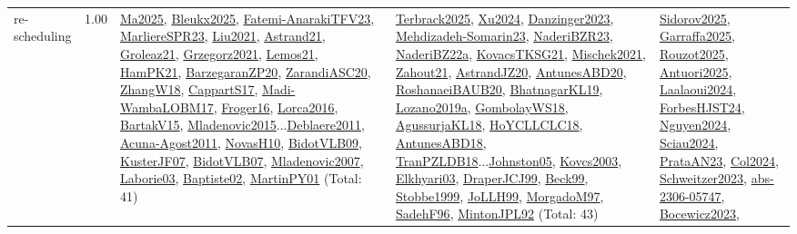 {\begin{longtable}{p{3cm}r>{\raggedright\arraybackslash}p{6cm}>{\raggedright\arraybackslash}p{6cm}>{\raggedright\arraybackslash}p{8cm}}
\index{re-scheduling}\index{Concepts!re-scheduling}re-scheduling &  1.00 & \hyperref[detail:Ma2025]{Ma2025}, \hyperref[detail:Bleukx2025]{Bleukx2025}, \hyperref[detail:Fatemi-AnarakiTFV23]{Fatemi-AnarakiTFV23}, \hyperref[detail:MarliereSPR23]{MarliereSPR23}, \hyperref[detail:Liu2021]{Liu2021}, \hyperref[detail:Astrand21]{Astrand21}, \hyperref[detail:Groleaz21]{Groleaz21}, \hyperref[detail:Grzegorz2021]{Grzegorz2021}, \hyperref[detail:Lemos21]{Lemos21}, \hyperref[detail:HamPK21]{HamPK21}, \hyperref[detail:BarzegaranZP20]{BarzegaranZP20}, \hyperref[detail:ZarandiASC20]{ZarandiASC20}, \hyperref[detail:ZhangW18]{ZhangW18}, \hyperref[detail:CappartS17]{CappartS17}, \hyperref[detail:Madi-WambaLOBM17]{Madi-WambaLOBM17}, \hyperref[detail:Froger16]{Froger16}, \hyperref[detail:Lorca2016]{Lorca2016}, \hyperref[detail:BartakV15]{BartakV15}, \hyperref[detail:Mladenovic2015]{Mladenovic2015}...\hyperref[detail:Deblaere2011]{Deblaere2011}, \hyperref[detail:Acuna-Agost2011]{Acuna-Agost2011}, \hyperref[detail:NovasH10]{NovasH10}, \hyperref[detail:BidotVLB09]{BidotVLB09}, \hyperref[detail:KusterJF07]{KusterJF07}, \hyperref[detail:BidotVLB07]{BidotVLB07}, \hyperref[detail:Mladenovic2007]{Mladenovic2007}, \hyperref[detail:Laborie03]{Laborie03}, \hyperref[detail:Baptiste02]{Baptiste02}, \hyperref[detail:MartinPY01]{MartinPY01} (Total: 41) & \hyperref[detail:Terbrack2025]{Terbrack2025}, \hyperref[detail:Xu2024]{Xu2024}, \hyperref[detail:Danzinger2023]{Danzinger2023}, \hyperref[detail:Mehdizadeh-Somarin23]{Mehdizadeh-Somarin23}, \hyperref[detail:NaderiBZR23]{NaderiBZR23}, \hyperref[detail:NaderiBZ22a]{NaderiBZ22a}, \hyperref[detail:KovacsTKSG21]{KovacsTKSG21}, \hyperref[detail:Mischek2021]{Mischek2021}, \hyperref[detail:Zahout21]{Zahout21}, \hyperref[detail:AstrandJZ20]{AstrandJZ20}, \hyperref[detail:AntunesABD20]{AntunesABD20}, \hyperref[detail:RoshanaeiBAUB20]{RoshanaeiBAUB20}, \hyperref[detail:BhatnagarKL19]{BhatnagarKL19}, \hyperref[detail:Lozano2019a]{Lozano2019a}, \hyperref[detail:GombolayWS18]{GombolayWS18}, \hyperref[detail:AgussurjaKL18]{AgussurjaKL18}, \hyperref[detail:HoYCLLCLC18]{HoYCLLCLC18}, \hyperref[detail:AntunesABD18]{AntunesABD18}, \hyperref[detail:TranPZLDB18]{TranPZLDB18}...\hyperref[detail:Johnston05]{Johnston05}, \hyperref[detail:Kovcs2003]{Kovcs2003}, \hyperref[detail:Elkhyari03]{Elkhyari03}, \hyperref[detail:DraperJCJ99]{DraperJCJ99}, \hyperref[detail:Beck99]{Beck99}, \hyperref[detail:Stobbe1999]{Stobbe1999}, \hyperref[detail:JoLLH99]{JoLLH99}, \hyperref[detail:MorgadoM97]{MorgadoM97}, \hyperref[detail:SadehF96]{SadehF96}, \hyperref[detail:MintonJPL92]{MintonJPL92} (Total: 43) & \hyperref[detail:Sidorov2025]{Sidorov2025}, \hyperref[detail:Garraffa2025]{Garraffa2025}, \hyperref[detail:Rouzot2025]{Rouzot2025}, \hyperref[detail:Antuori2025]{Antuori2025}, \hyperref[detail:Laalaoui2024]{Laalaoui2024}, \hyperref[detail:ForbesHJST24]{ForbesHJST24}, \hyperref[detail:Nguyen2024]{Nguyen2024}, \hyperref[detail:Sciau2024]{Sciau2024}, \hyperref[detail:PrataAN23]{PrataAN23}, \hyperref[detail:Col2024]{Col2024}, \hyperref[detail:Schweitzer2023]{Schweitzer2023}, \hyperref[detail:abs-2306-05747]{abs-2306-05747}, \hyperref[detail:Bocewicz2023]{Bocewicz2023}, 
\end{longtable}}
